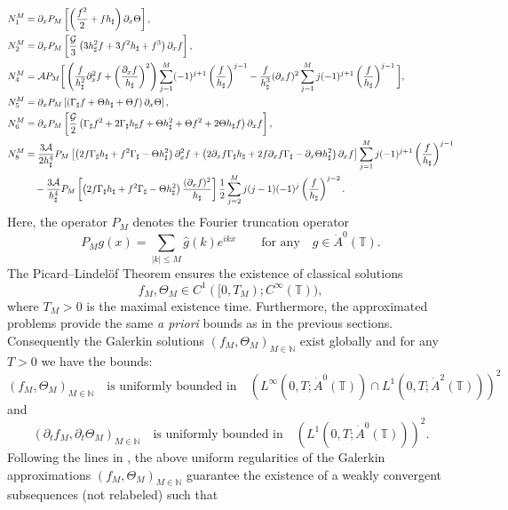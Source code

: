 \documentclass[reqno,11pt]{amsart}
\newcommand{\NN}{{\mathbb N}}
\newcommand{\TT}{{\mathbb T}}
\newcommand{\pax}{\partial_x}
\newcommand{\bh}{h_\sharp}
\newcommand{\bG}{\Gamma_\sharp}
\begin{document}
{\begin{align*}
N_1^M&=\pax P_M\left[\left(\frac{f^2}{2}+f\bh\right)\partial_x \Theta\right],\\
N_2^M&=\partial_x P_M \left[\frac{\mathcal{G}}{3}\left(3\bh^2 f+3f^2\bh+f^3\right)\partial_x f\right],\\
N_4^M&=\mathcal{A} P_M \bigg{[}\left(\frac{f}{\bh^2}\partial_x^2 f +\left(\frac{\partial_x f}{\bh}\right)^2\right)\sum_{j=1}^M (-1)^{j+1}\left(\frac{f}{\bh}\right)^{j-1}-\frac{f}{\bh^3}(\partial_x f)^2\sum_{j=1}^M j(-1)^{j+1}\left(\frac{f}{\bh}\right)^{j-1} \bigg{]},\\
N_5^M&=\pax P_M\left[\left(\bG f+\Theta\bh+\Theta f\right)\partial_x \Theta\right],\\
N_6^M&=\pax P_M\left[\frac{\mathcal{G}}{2}\left(\bG f^2+2\bG\bh f+\Theta\bh^2+\Theta f^2+2\Theta\bh f\right)\partial_x f\right],\\
N_8^M&=\frac{3\mathcal{A}}{2\bh^4} P_M\left[\left(2f\bG\bh+f^2\bG-\Theta \bh^2\right)\partial_x^2 f+\left(2\pax f\bG\bh+2f\pax f\bG-\pax \Theta \bh^2\right)\partial_x f\right]\sum_{j=1}^M j(-1)^{j+1}\left(\frac{f}{\bh}\right)^{j-1}\nonumber\\
&\quad- \frac{3\mathcal{A}}{\bh^4} P_M\left[\left(2f\bG\bh+f^2\bG-\Theta \bh^2\right)\frac{(\partial_x f)^2}{\bh}\right]\frac{1}{2}\sum_{j=2}^M j(j-1)(-1)^{j}\left(\frac{f}{\bh}\right)^{j-2}.
\end{align*}
Here, the operator $P_M$ denotes the Fourier truncation operator
\[
	P_M g(x)=\sum_{|k|\leq M} \hat g(k)e^{ikx}\qquad\mbox{for any}\quad g\in \dot A^0(\TT).
\]
The Picard--Lindel\"of Theorem ensures the existence of classical solutions 
\[
f_M,\Theta_M\in C^1([0,T_M);C^\infty(\TT)),
\]
 where $T_M>0$ is the maximal existence time.  Furthermore, the approximated problems provide the same \emph{a priori} bounds as in the previous sections.  Consequently the Galerkin solutions  $(f_M,\Theta_M)_{M\in \NN}$ exist globally and for any $T>0$ we have the bounds:
\begin{equation}\label{boundedness}
	(f_M,\Theta_M)_{M\in\NN} \quad \mbox{is uniformly bounded in}\quad \left( L^\infty\left(0,T;\dot A^0(\TT)\right)\cap L^1\left(0,T; \dot A^2(\TT) \right)\right)^2
\end{equation}
and
\begin{equation}\label{boundednesst}
(\partial_t f_M,\partial_t\Theta_M)_{M\in\NN} \quad \mbox{is uniformly bounded in}\quad \left( L^1\left(0,T; \dot A^0(\TT) \right)\right)^2.
\end{equation}
Following the lines in \cite{BG18}, the above uniform regularities of the Galerkin approximations $(f_M,\Theta_M)_{M\in\NN} $ guarantee the existence of a weakly convergent subsequences (not relabeled) such that 
}
\end{document}
